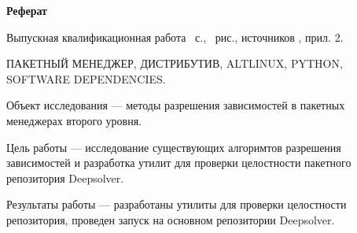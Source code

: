 \begin{center}
	\textbf{Реферат}
\end{center}

Выпускная квалификационная работа ~с., ~рис., источников , прил. 2.

ПАКЕТНЫЙ МЕНЕДЖЕР, ДИСТРИБУТИВ, ALTLINUX, PYTHON, SOFTWARE DEPENDENCIES.

Объект исследования --- методы разрешения зависимостей в пакетных менеджерах второго уровня.

Цель работы --- исследование существующих алгоримтов разрешения зависимостей и разработка
утилит для проверки целостности пакетного репозитория Deepsolver.

Результаты работы --- разработаны утилиты для проверки целостности репозитория, проведен запуск
на основном репозитории Deepsolver.

